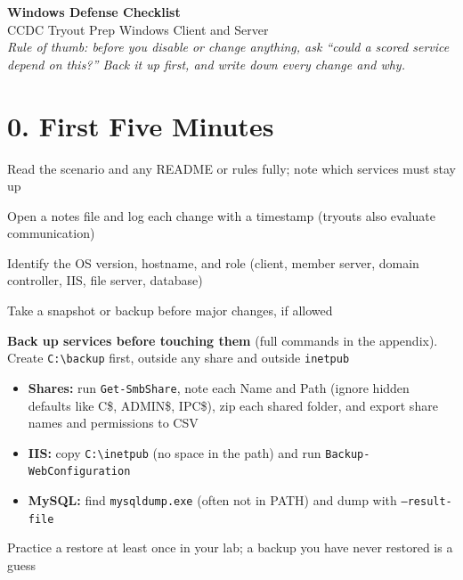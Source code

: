 \documentclass[11pt]{article}
\newcommand{\cmd}[1]{\texttt{\small #1}}
\begin{document}
{\LARGE\bfseries\color{accent} Windows Defense Checklist}\\[2pt]
{\large CCDC Tryout Prep \textbullet{} Windows Client and Server}\\[2pt]
\textit{Rule of thumb: before you disable or change anything, ask ``could a scored service depend on this?'' Back it up first, and write down every change and why.}

\section*{0. First Five Minutes}
\begin{mycheck}
  \item Read the scenario and any README or rules fully; note which services must stay up
  \item Open a notes file and log each change with a timestamp (tryouts also evaluate communication)
  \item Identify the OS version, hostname, and role (client, member server, domain controller, IIS, file server, database)
  \item Take a snapshot or backup before major changes, if allowed
  \item \textbf{Back up services before touching them} (full commands in the appendix). Create \cmd{C:\textbackslash backup} first, outside any share and outside \cmd{inetpub}
  \begin{itemize}[itemsep=1pt, topsep=1pt]
    \item \textbf{Shares:} run \cmd{Get-SmbShare}, note each Name and Path (ignore hidden defaults like C\$, ADMIN\$, IPC\$), zip each shared folder, and export share names and permissions to CSV
    \item \textbf{IIS:} copy \cmd{C:\textbackslash inetpub} (no space in the path) and run \cmd{Backup-WebConfiguration}
    \item \textbf{MySQL:} find \cmd{mysqldump.exe} (often not in PATH) and dump with \cmd{--result-file}
  \end{itemize}
  \item Practice a restore at least once in your lab; a backup you have never restored is a guess
\end{mycheck}
\end{document}
